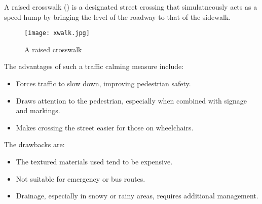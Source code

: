 A raised crosswalk () is a designated street crossing that simulatneously acts as a speed hump by bringing the level of the roadway to that of the sidewalk.

\begin{figure}
	\centering
	\texttt{[image: xwalk.jpg]}
	\caption{A raised crosswalk\cite{kimley-xwalk}}\label{fig:xwalk}
\end{figure}

The advantages of such a traffic calming measure include:\begin{itemize}
	\item Forces traffic to slow down, improving pedestrian safety.
	\item Draws attention to the pedestrian, especially when combined with signage and markings.
	\item Makes crossing the street easier for those on wheelchairs.
\end{itemize}

The drawbacks are:\begin{itemize}
	\item The textured materials used tend to be expensive.
	\item Not suitable for emergency or bus routes.
	\item Drainage, especially in snowy or rainy areas, requires additional management.
\end{itemize}

